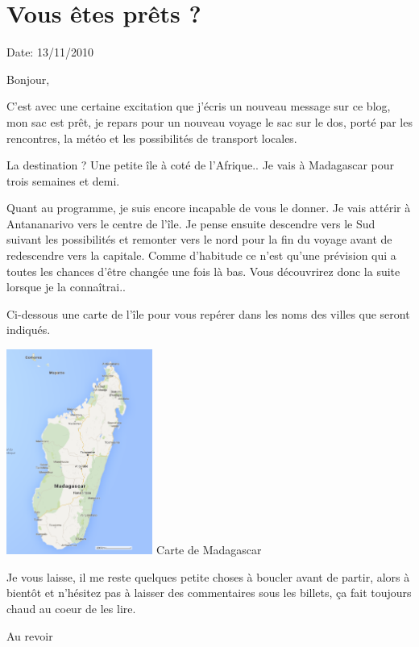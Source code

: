 \section{Vous êtes prêts ?}

Date: 13/11/2010

\begin{multicols}{2}

Bonjour,

C'est avec une certaine excitation que j'écris un nouveau message sur ce blog, mon sac est prêt, je repars pour un nouveau voyage le sac sur le dos, porté par les rencontres, la météo et les possibilités de transport locales.

La destination ? Une petite île à coté de l'Afrique.. Je vais à Madagascar pour trois semaines et demi.

Quant au programme, je suis encore incapable de vous le donner. Je vais attérir à Antananarivo vers le centre de l'île. Je pense ensuite descendre vers le Sud suivant les possibilités et remonter vers le nord pour la fin du voyage avant de redescendre vers la capitale. Comme d'habitude ce n'est qu'une prévision qui a toutes les chances d'être changée une fois là bas. Vous découvrirez donc la suite lorsque je la connaîtrai..

Ci-dessous une carte de l'île pour vous repérer dans les noms des villes que seront indiqués.

\hspace*{-0.65cm}
\includegraphics[width=4.8cm]{articles/Vous-etes-prets/madagascar.png}
Carte de Madagascar

Je vous laisse, il me reste quelques petite choses à boucler avant de partir, alors à bientôt et n'hésitez pas à laisser des commentaires sous les billets, ça fait toujours chaud au coeur de les lire.

Au revoir

\end{multicols}


